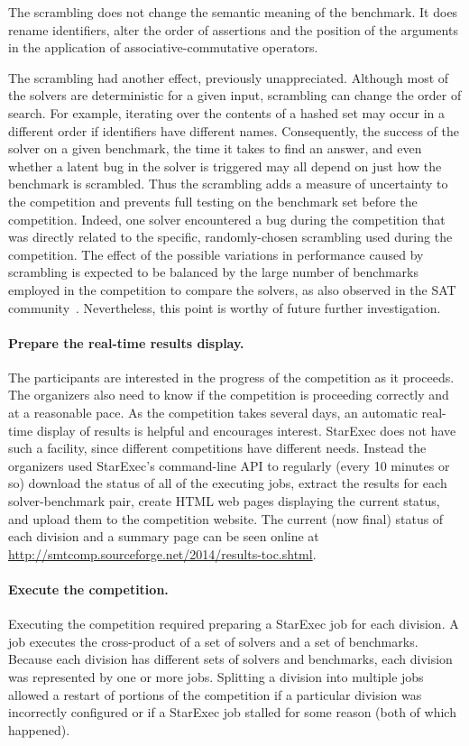 \documentclass[twoside,11pt]{article}
\begin{document}
The scrambling does not change the semantic meaning of the benchmark. It does rename identifiers, alter the order of assertions and the position of the arguments in the application of associative-commutative operators.

The scrambling had another effect, previously unappreciated. Although most of the solvers are deterministic for a given input, scrambling can change the order of search. For example, iterating over the contents of a hashed set may occur in a different order if identifiers have different names. Consequently, the success of the solver on a given benchmark, the time it takes to find an answer, and even whether a latent bug in the solver is triggered may all depend on just how the benchmark is scrambled. Thus the scrambling adds a measure of uncertainty to the competition and prevents full testing on the benchmark set before the competition. Indeed, one solver encountered a bug during the competition that was directly related to the specific, randomly-chosen scrambling used during the competition. The effect of the possible variations in performance caused by scrambling is expected to be balanced by the large number of benchmarks employed in the competition to compare the solvers, as also observed in the SAT community~\cite{leberre+03}. Nevertheless, this point is worthy of future further investigation.

\paragraph{Prepare the real-time results display.} The participants are interested in the progress of the competition as it proceeds. The organizers also need to know if the competition is proceeding correctly and at a reasonable pace. As the competition takes several days, an automatic real-time display of results is helpful and encourages interest.  StarExec does not have such a facility, since different competitions have different needs. Instead the organizers used StarExec's command-line API to regularly (every 10 minutes or so) download the status of all of the executing jobs, extract the results for each solver-benchmark pair, create HTML web pages displaying the current status, and upload them to the competition website. The current (now final) status of each division and a summary page can be seen online at \url{http://smtcomp.sourceforge.net/2014/results-toc.shtml}.

\paragraph{Execute the competition.} Executing the competition required preparing a StarExec job for each
division. A job executes the cross-product of a set of solvers and a set of benchmarks. Because each division has different sets of solvers and benchmarks, each division was represented by one or more jobs. Splitting a division into multiple jobs allowed a restart of portions of the competition if a particular division was incorrectly configured or if a StarExec job stalled for some reason (both of which happened).
\end{document}
